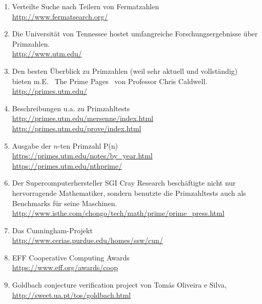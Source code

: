 \begin{refsegment}
\begin{enumerate}
\item Verteilte Suche nach Teilern von Fermatzahlen \\
      \url{http://www.fermatsearch.org/}

\item Die Universität von Tennessee hostet umfangreiche
      Forschungsergebnisse über Primzahlen. \\
      \url{http://www.utm.edu/}

\item Den besten Überblick zu Primzahlen (weil sehr aktuell und vollständig)
      bieten m.E.  ~\glqq The Prime Pages\grqq~ von Professor Chris Caldwell.
       \\
      \url{http://primes.utm.edu/}

\item Beschreibungen u.a. zu Primzahltests\\
      \url{http://primes.utm.edu/mersenne/index.html}\\
      \url{http://primes.utm.edu/prove/index.html}

\item Ausgabe der $n$-ten Primzahl P(n)\\
      \url{https://primes.utm.edu/notes/by_year.html}\\
      \url{https://primes.utm.edu/nthprime/}

\item Der Supercomputerhersteller SGI Cray Research beschäftigte nicht
      nur hervorragende Mathematiker, sondern benutzte die Primzahltests
      auch als Benchmarks für seine Maschinen.\\
      \url{http://www.isthe.com/chongo/tech/math/prime/prime_press.html}

\item Das Cunningham-Projekt\\
      \url{http://www.cerias.purdue.edu/homes/ssw/cun/}

\item EFF Cooperative Computing Awards\\
	\url{https://www.eff.org/awards/coop}

\item Goldbach conjecture verification project von Tomás Oliveira e Silva,
      \\
      \url{http://sweet.ua.pt/tos/goldbach.html}


\end{enumerate}
\end{refsegment}
